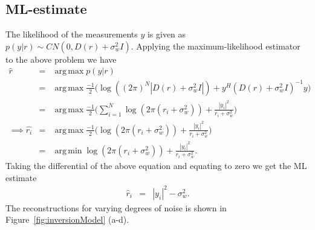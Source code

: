 \documentclass[a4paper, 11pt]{article}
\DeclareMathOperator*{\argmax}{arg\,max}
\DeclareMathOperator*{\argmin}{arg\,min}
\begin{document}
\subsection{ML-estimate}
The likelihood of the measurements $y$ is given as $p(y|r)\sim CN(0,D(r)+\sigma_w^2I)$. Applying the maximum-likelihood estimator to the above problem we have  
\begin{eqnarray*}
\hat{r}&=& \argmax p(y|r) \\
&=& \argmax \frac{-1}{2} \Bigg( \log\left( (2\pi)^N|D(r)+\sigma_w^2I|\right)+y^H (D(r)+\sigma_w^2I)^{-1}y\Bigg) \\
&=& \argmax \frac{-1}{2} \Bigg( \sum_{i=1}^N \log \left( 2\pi (r_i +\sigma_w ^2)\right) +\frac{|y_i|^2}{r_i +\sigma_w^2}\Bigg) \\
\implies \hat{r_i}&=& \argmax \frac{-1}{2} \Bigg( \log \left( 2\pi (r_i +\sigma_w ^2)\right) +\frac{|y_i|^2}{r_i +\sigma_w^2} \Bigg) \\
&=& \argmin \log \left( 2\pi (r_i +\sigma_w ^2)\right) +\frac{|y_i|^2}{r_i +\sigma_w^2}.
\end{eqnarray*}
Taking the differential of the above equation and equating to zero we get the ML estimate   
\begin{eqnarray*}
\hat{r}_i&=&|y_i|^2-\sigma_w^2.
\end{eqnarray*}
The reconstructions for varying degrees of noise is shown in Figure~\ref{fig:inversionModel} (a-d). 
\end{document}

